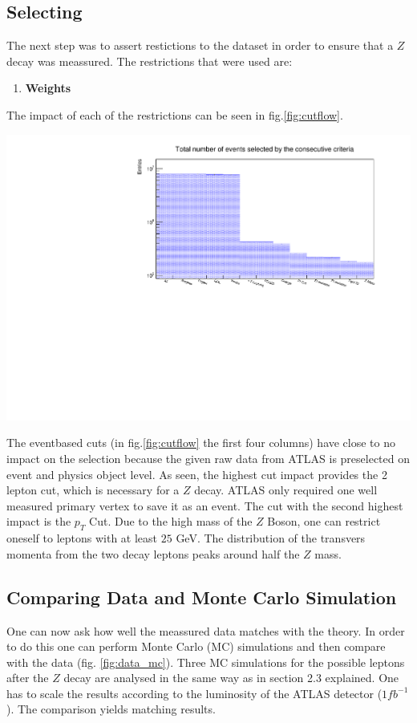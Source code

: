 \documentclass[12pt, a4paper, bibliography=totoc]{scrartcl}
\begin{document}
\begin{multicols}{2}
\subsection{Selecting} 
The next step was to assert restictions to the dataset in order to ensure that a $Z$ decay was meassured.
The restrictions that were used are:
\begin{enumerate}
    \item \textbf{Weights} 
\end{enumerate}

The impact of each of the restrictions can be seen in fig.\ref{fig:cutflow}. 
\begin{center}
	\includegraphics[width=\linewidth]{fig/cutflow.pdf}
	\label{fig:cutflow}
\end{center}
The eventbased cuts (in fig.\ref{fig:cutflow} the first four columns) have close to no impact on the selection because the given raw data from ATLAS is preselected on event and physics object level.
As seen, the highest cut impact provides the 2 lepton cut, which  is necessary for a $Z$ decay. ATLAS only required one well measured primary vertex to save it as an event.
The cut with the second highest impact is the $p_{T}$ Cut. Due to the high mass of the $Z$ Boson, one can restrict oneself to leptons with at least $25$ GeV. The distribution of the transvers momenta from the two decay leptons peaks around half the $Z$ mass. 


\subsection{Comparing Data and Monte Carlo Simulation}
One can now ask how well the meassured data matches with the theory. 
In order to do this one can perform Monte Carlo (MC) simulations and then compare with the data (fig. \ref{fig:data_mc}). 
Three MC simulations for the possible leptons after the $Z$ decay are analysed in the same way as in section 2.3 explained. One has to scale the results according to the luminosity of the ATLAS detector ($1 fb^{-1}$).
The comparison yields matching results.


\end{multicols}
\end{document}
